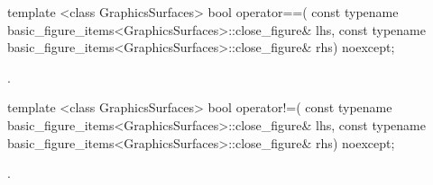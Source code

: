 %
\begin{itemdecl}
template <class GraphicsSurfaces>
bool operator==(
  const typename basic_figure_items<GraphicsSurfaces>::close_figure& lhs,
  const typename basic_figure_items<GraphicsSurfaces>::close_figure& rhs)
  noexcept;
\end{itemdecl}
\begin{itemdescr}
\pnum
\returns {}.
\end{itemdescr}

%
\begin{itemdecl}
template <class GraphicsSurfaces>
bool operator!=(
  const typename basic_figure_items<GraphicsSurfaces>::close_figure& lhs,
  const typename basic_figure_items<GraphicsSurfaces>::close_figure& rhs)
  noexcept;
\end{itemdecl}
\begin{itemdescr}
\pnum
\returns {}.
\end{itemdescr}
